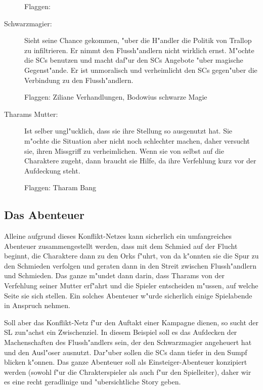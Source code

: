 \begin{description}
  Flaggen: 

  \item[Schwarzmagier:] Sieht seine Chance gekommen, "uber die H"andler die Politik von Trallop zu infiltrieren. Er nimmt den Flussh"andlern nicht wirklich ernst. M"ochte die SCs benutzen und macht daf"ur den SCs Angebote "uber magische Gegenst"ande. Er ist unmoralisch und verheimlicht den SCs gegen"uber die Verbindung zu den Flussh"andlern.

  Flaggen: Ziliane Verhandlungen, Bodowius schwarze Magie

  \item[Tharams Mutter:] Ist selber ungl"ucklich, dass sie ihre Stellung so ausgenutzt hat. Sie m"ochte die Situation aber nicht noch schlechter machen, daher versucht sie, ihren Missgriff zu verheimlichen. Wenn sie von selbst auf die Charaktere zugeht, dann braucht sie Hilfe, da ihre Verfehlung kurz vor der Aufdeckung steht.

  Flaggen: Tharam Bang
\end{description}



\subsection{Das Abenteuer}
Alleine aufgrund dieses Konflikt-Netzes kann sicherlich ein umfangreiches Abenteuer zusammengestellt werden, dass mit dem Schmied auf der Flucht beginnt, die Charaktere dann zu den Orks f"uhrt, von da k"onnten sie die Spur zu den Schmieden verfolgen und geraten dann in den Streit zwischen Flussh"andlern und Schmieden. Das ganze m"undet dann darin, dass Tharams von der Verfehlung seiner Mutter erf"ahrt und die Spieler entscheiden m"ussen, auf welche Seite sie sich stellen. Ein solches Abenteuer w"urde sicherlich einige Spielabende in Anspruch nehmen.

Soll aber das Konflikt-Netz f"ur den Auftakt einer Kampagne dienen, so sucht der SL zun"achst ein Zwischenziel. In diesem Beispiel soll es das Aufdecken der Machenschaften des Flussh"andlers sein, der den Schwarzmagier angeheuert hat und den Ausl"oser ausnutzt. Dar"uber sollen die SCs dann tiefer in den Sumpf blicken k"onnen. Das ganze Abenteuer soll als Einsteiger-Abenteuer konzipiert werden (sowohl f"ur die Chrakterspieler als auch f"ur den Spielleiter), daher wir es eine recht geradlinige und "ubersichtliche Story geben.

